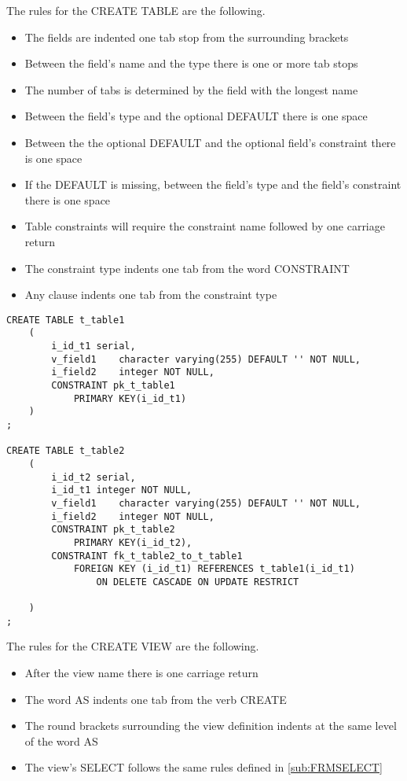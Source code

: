 The rules for the CREATE TABLE are the following.
\begin{itemize}
 \item The fields are indented one tab stop from the surrounding brackets
 \item Between the field's name and the type there is one or more tab stops
 \item The number of tabs is determined by the field with the longest name
 \item Between the field's type and the optional DEFAULT there is one space
 \item Between the the optional DEFAULT and the optional field's constraint there is one space
 \item If the DEFAULT is missing, between the field's type and the field's constraint there is one space
 \item Table constraints will require the constraint name followed by one carriage return 
 \item The constraint type indents one tab from the word CONSTRAINT
 \item Any clause indents one tab from the constraint type
\end{itemize}

\begin{lstlisting}[style=pgsql]
CREATE TABLE t_table1
	(
		i_id_t1	serial,
		v_field1	character varying(255) DEFAULT '' NOT NULL,
		i_field2	integer NOT NULL,
		CONSTRAINT pk_t_table1
			PRIMARY KEY(i_id_t1)
	)
;

CREATE TABLE t_table2
	(
		i_id_t2	serial,
		i_id_t1	integer NOT NULL,
		v_field1	character varying(255) DEFAULT '' NOT NULL,
		i_field2	integer NOT NULL,
		CONSTRAINT pk_t_table2
			PRIMARY KEY(i_id_t2),
		CONSTRAINT fk_t_table2_to_t_table1
			FOREIGN KEY (i_id_t1) REFERENCES t_table1(i_id_t1)
				ON DELETE CASCADE ON UPDATE RESTRICT
		
	)
;
\end{lstlisting}

The rules for the CREATE VIEW are the following.
\begin{itemize}
 \item After the view name there is one carriage return
 \item The word AS indents one tab from the verb CREATE
 \item The round brackets surrounding the view definition indents at the same level of the word AS
 \item The view's SELECT follows the same rules defined in \ref{sub:FRMSELECT}
\end{itemize}


